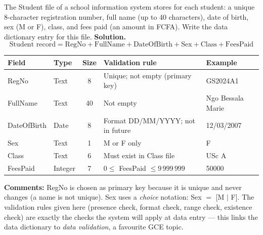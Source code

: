 \documentclass[11pt]{article}
\newcommand{\cle}[1]{{\popxbold\color{popdark}#1}}
\begin{document}
\begin{exoresolu}
The Student file of a school information system stores for each student: a unique 8-character registration number, full name (up to 40 characters), date of birth, sex (M or F), class, and fees paid (an amount in FCFA). Write the data dictionary entry for this file.
\tcblower
\textbf{Solution.}
\[
\text{Student record} = \text{RegNo} + \text{FullName} + \text{DateOfBirth} + \text{Sex} + \text{Class} + \text{FeesPaid}
\]

\begin{center}
\begin{tabularx}{\linewidth}{|l|l|c|X|l|}
\hline
\rowcolor{popblueL} \textbf{Field} & \textbf{Type} & \textbf{Size} & \textbf{Validation rule} & \textbf{Example} \\
\hline
RegNo & Text & 8 & Unique; not empty (primary key) & GS2024A1 \\
\hline
FullName & Text & 40 & Not empty & Ngo Bessala Marie \\
\hline
DateOfBirth & Date & 8 & Format DD/MM/YYYY; not in future & 12/03/2007 \\
\hline
Sex & Text & 1 & M or F only & F \\
\hline
Class & Text & 6 & Must exist in Class file & USc A \\
\hline
FeesPaid & Integer & 7 & $0 \leq$ FeesPaid $\leq 9\,999\,999$ & 50000 \\
\hline
\end{tabularx}
\end{center}

\textbf{Comments:} RegNo is chosen as \cle{primary key} because it is unique and never changes (a name is not unique). Sex uses a \emph{choice} notation: Sex $=$ [M $\mid$ F]. The validation rules given here (presence check, format check, range check, existence check) are exactly the checks the system will apply at data entry — this links the data dictionary to \emph{data validation}, a favourite GCE topic.
\end{exoresolu}
\end{document}
